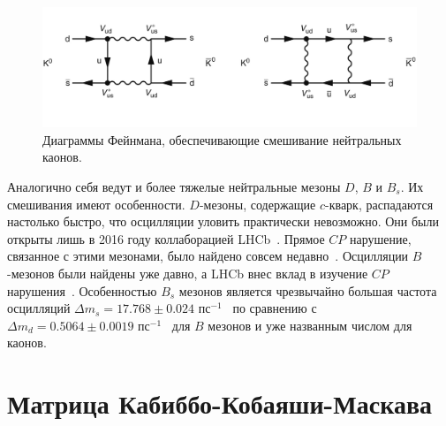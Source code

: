 \documentclass[a4paper, 10pt, twocolumn]{article}
\begin{document}
\begin{figure}%
	\centering
	\includegraphics[width=\linewidth]{figures/K-mixing}
	\caption{Диаграммы Фейнмана, обеспечивающие смешивание нейтральных каонов.}
	\label{fig:kaon-mixing}
\end{figure}%

Аналогично себя ведут и более тяжелые нейтральные мезоны $D$, $B$ 
и $B_s$. Их смешивания имеют особенности. $D$-мезоны, содержащие 
$c$-кварк, распадаются настолько быстро, что осцилляции уловить 
практически невозможно. Они были открыты лишь в 2016 году коллаборацией 
LHCb~\cite{D-oscillations}. Прямое $CP$ нарушение, связанное с этими 
мезонами, было найдено совсем недавно~\cite{D-CP-violation}. Осцилляции 
$B$-мезонов были найдены уже давно, а LHCb внес вклад в изучение $CP$ 
нарушения~\cite{B-CP-violation}. Особенностью $B_s$ мезонов является 
чрезвычайно большая частота осцилляций $\Delta m_s = 17.768 \pm 
0.024\text{~пс}^{-1}$~\cite{Bs-oscillations} по сравнению с $\Delta m_d 
= 0.5064 \pm 0.0019\text{~пс}^{-1}$~\cite{B-oscillations} для $B$ 
мезонов и уже названным числом для каонов.


\section{Матрица Кабиббо-Кобаяши-Маскава}
\def\peakx{\bar{\rho}}
\def\peaky{\bar{\eta}}
\end{document}
